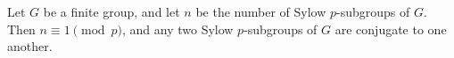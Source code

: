 \documentclass[12pt]{article}
\begin{document}
Let $G$ be a finite group, and let $n$ be the number of Sylow
$p$-subgroups of $G$.  Then $n\equiv 1\pmod{p}$, and any
two Sylow $p$-subgroups of $G$ are conjugate to one another.

\end{document}

